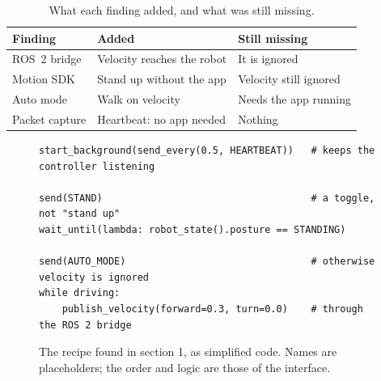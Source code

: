 \documentclass[11pt,a4paper]{article}
\begin{document}
\begin{table}[p]
\centering
\caption{What each finding added, and what was still missing.}
\label{tab:findings}
\begin{tabular}{@{}lll@{}}
\toprule
Finding & Added & Still missing \\
\midrule
ROS~2 bridge   & Velocity reaches the robot & It is ignored \\
Motion SDK     & Stand up without the app   & Velocity still ignored \\
Auto mode      & Walk on velocity           & Needs the app running \\
Packet capture & Heartbeat: no app needed   & Nothing \\
\bottomrule
\end{tabular}
\end{table}

\begin{figure}[p]
\begin{lstlisting}
start_background(send_every(0.5, HEARTBEAT))   # keeps the controller listening

send(STAND)                                    # a toggle, not "stand up"
wait_until(lambda: robot_state().posture == STANDING)

send(AUTO_MODE)                                # otherwise velocity is ignored
while driving:
    publish_velocity(forward=0.3, turn=0.0)    # through the ROS 2 bridge
\end{lstlisting}
\caption{The recipe found in section 1, as simplified code. Names are placeholders; the order and logic are
those of the interface.}
\label{lst:recipe}
\end{figure}
\end{document}
